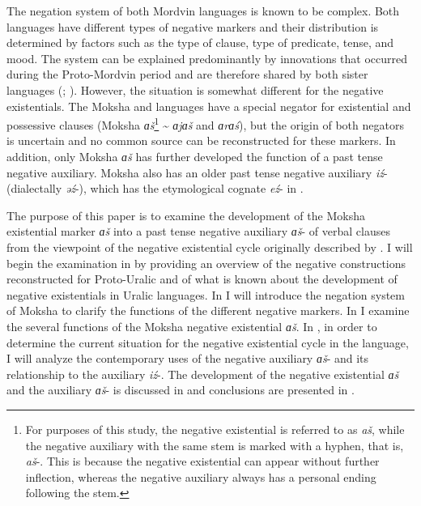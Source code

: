 \documentclass[output=paper]{langsci/langscibook}
\begin{document}
  The negation system of both Mordvin languages is known to be complex. Both languages have different types of negative markers and their distribution is determined by factors such as the type of clause, type of predicate, tense, and mood. The system can be explained predominantly by innovations that occurred during the Proto-Mordvin period and are therefore shared by both sister languages (\citealt[140--144]{Bartens1999}; \citealt{Hamari2007,Hamari2011,Hamari2013,HamariAasmae2015}). However, the situation is somewhat different for the negative existentials. The Moksha and  languages have a special negator for existential and possessive clauses (Moksha \textit{ɑš}\footnote{For purposes of this study, the negative existential is referred to as \textit{aš}, while the negative auxiliary with the same stem is marked with a hyphen, that is, \textit{aš}-. This is because the negative existential can appear without further inflection, whereas the negative auxiliary always has a personal ending following the stem.} \textasciitilde{} \textit{ɑjɑš} and  \textit{ɑrɑś}), but the origin of both negators is uncertain and no common source can be reconstructed for these markers. In addition, only Moksha \textit{ɑš} has further developed the function of a past tense negative auxiliary. Moksha also has an older past tense negative auxiliary \textit{iź}- (dialectally \textit{əź}-), which has the etymological cognate \textit{eź}- in .

  The purpose of this paper is to examine the development of the Moksha existential marker \textit{ɑš} into a past tense negative auxiliary \textit{ɑš}- of verbal clauses from the viewpoint of the negative existential cycle originally described by \citet{Croft1991}. I will begin the examination in  by providing an overview of the negative constructions reconstructed for Proto-Uralic and of what is known about the development of negative existentials in Uralic languages. In  I will introduce the negation system of Moksha to clarify the functions of the different negative markers. In  I examine the several functions of the Moksha negative existential \textit{ɑš}. In , in order to determine the current situation for the negative existential cycle in the language, I will analyze the contemporary uses of the negative auxiliary \textit{ɑš}- and its relationship to the auxiliary \textit{iź}-. The development of the negative existential \textit{ɑš} and the auxiliary \textit{ɑš}- is discussed in  and conclusions are presented in .
\end{document}
